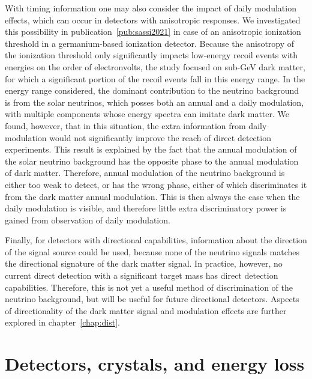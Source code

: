 With timing information one may also consider the impact of daily modulation effects, which can occur in detectors with anisotropic responses. We investigated this possibility in publication~\ref{pub:sassi2021} in case of an anisotropic ionization threshold in a germanium-based ionization detector. Because the anisotropy of the ionization threshold only significantly impacts low-energy recoil events with energies on the order of electronvolts, the study focused on sub-GeV dark matter, for which a significant portion of the recoil events fall in this energy range. In the energy range considered, the dominant contribution to the neutrino background is from the solar neutrinos, which posses both an annual and a daily modulation, with multiple components whose energy spectra can imitate dark matter. We found, however, that in this situation, the extra information from daily modulation would not significantly improve the reach of direct detection experiments. This result is explained by the fact that the annual modulation of the solar neutrino background has the opposite phase to the annual modulation of dark matter. Therefore, annual modulation of the neutrino background is either too weak to detect, or has the wrong phase, either of which discriminates it from the dark matter annual modulation. This is then always the case when the daily modulation is visible, and therefore little extra discriminatory power is gained from observation of daily modulation.

Finally, for detectors with directional capabilities, information about the direction of the signal source could be used, because none of the neutrino signals matches the directional signature of the dark matter signal. In practice, however, no current direct detection with a significant target mass has direct detection capabilities. Therefore, this is not yet a useful method of discrimination of the neutrino background, but will be useful for future directional detectors. Aspects of directionality of the dark matter signal and modulation effects are further explored in chapter~\ref{chap:dist}.

\chapter{Detectors, crystals, and energy loss}
\label{chap:energy-loss}


